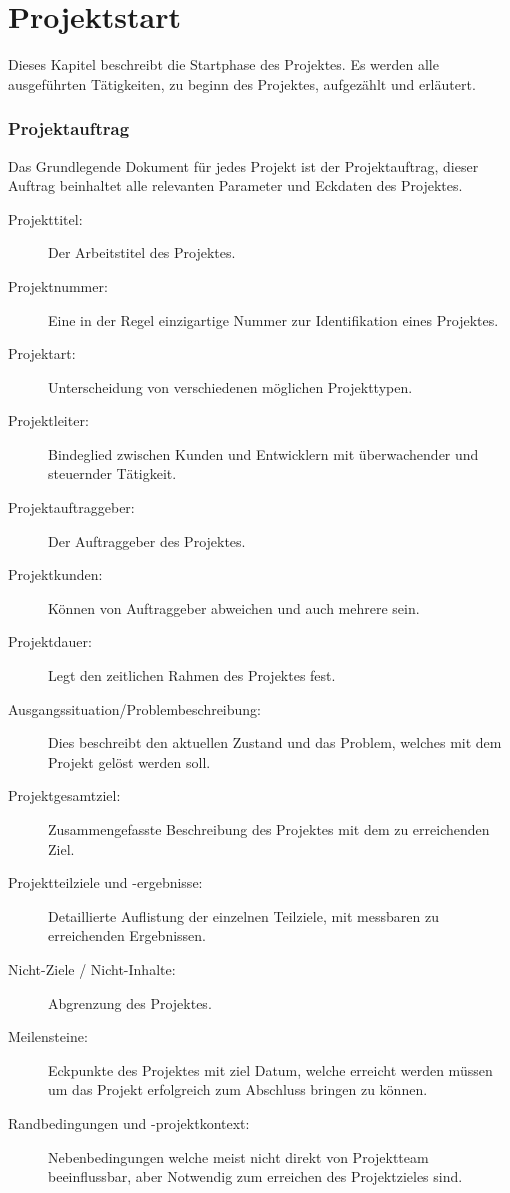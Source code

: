\chapter{Projektstart}

Dieses Kapitel beschreibt die Startphase des Projektes. Es werden alle ausgeführten Tätigkeiten, zu beginn des Projektes, aufgezählt und erläutert.

\subsection*{Projektauftrag}

Das Grundlegende Dokument für jedes Projekt ist der Projektauftrag, dieser Auftrag beinhaltet alle relevanten Parameter und Eckdaten des Projektes.

\begin{description}
\item[Projekttitel:] Der Arbeitstitel des Projektes.
\item[Projektnummer:] Eine in der Regel einzigartige Nummer zur Identifikation eines Projektes.
\item[Projektart:] Unterscheidung von verschiedenen möglichen Projekttypen.
\item[Projektleiter:] Bindeglied zwischen Kunden und Entwicklern mit überwachender und steuernder Tätigkeit.
\item[Projektauftraggeber:] Der Auftraggeber des Projektes.
\item[Projektkunden:] Können von Auftraggeber abweichen und auch mehrere sein.
\item[Projektdauer:] Legt den zeitlichen Rahmen des Projektes fest.
\item[Ausgangssituation/Problembeschreibung:] Dies beschreibt den aktuellen Zustand und das Problem, welches mit dem Projekt gelöst werden soll.
\item[Projektgesamtziel:] Zusammengefasste Beschreibung des Projektes mit dem zu erreichenden Ziel.
\item[Projektteilziele und -ergebnisse:] Detaillierte Auflistung der einzelnen Teilziele, mit messbaren zu erreichenden Ergebnissen.
\item[Nicht-Ziele / Nicht-Inhalte:] Abgrenzung des Projektes.
\item[Meilensteine:] Eckpunkte des Projektes mit ziel Datum, welche erreicht werden müssen um das Projekt erfolgreich zum Abschluss bringen zu können.
\item[Randbedingungen und -projektkontext:] Nebenbedingungen welche meist nicht direkt von Projektteam beeinflussbar, aber Notwendig zum erreichen des Projektzieles sind.

\end{description}
